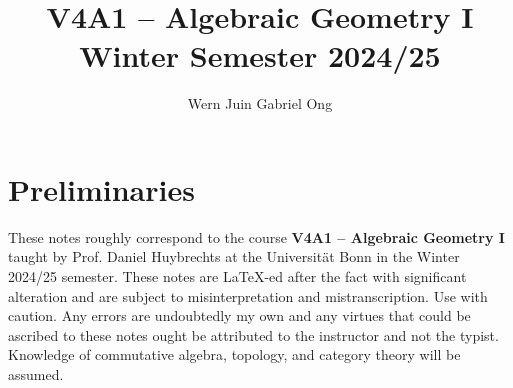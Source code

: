 \documentclass{amsart}
\theoremstyle{definition}
\numberwithin{equation}{section}
\begin{document}
\large
\title[Algebraic Geometry I -- Bonn, Winter 2024/25]{V4A1 -- Algebraic Geometry I \\ Winter Semester 2024/25}
\author{Wern Juin Gabriel Ong}
\address{Universit\"{a}t Bonn, Bonn, D-53113}
\maketitle
\section*{Preliminaries}
These notes roughly correspond to the course \textbf{V4A1 -- Algebraic Geometry I} taught by Prof. Daniel Huybrechts at the Universit\"{a}t Bonn in the Winter 2024/25 semester. These notes are \LaTeX-ed after the fact with significant alteration and are subject to misinterpretation and mistranscription. Use with caution. Any errors are undoubtedly my own and any virtues that could be ascribed to these notes ought be attributed to the instructor and not the typist. Knowledge of commutative algebra, topology, and category theory will be assumed. 
\tableofcontents












\newpage
\printbibliography
\end{document}
